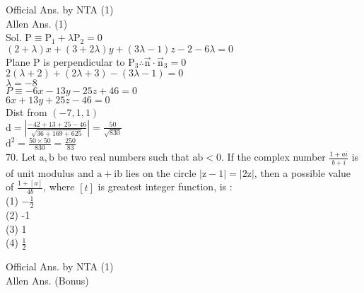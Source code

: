 \documentclass[10pt]{article}
\begin{document}
Official Ans. by NTA (1)\\
Allen Ans. (1)\\
Sol. \(\mathrm{P} \equiv \mathrm{P}_{1}+\lambda \mathrm{P}_{2}=0\)\\
\((2+\lambda) x+(3+2 \lambda) y+(3 \lambda-1) z-2-6 \lambda=0\)\\
Plane P is perpendicular to \(\mathrm{P}_{3} \therefore \overrightarrow{\mathrm{n}} \cdot \overrightarrow{\mathrm{n}}_{3}=0\)\\
\(2(\lambda+2)+(2 \lambda+3)-(3 \lambda-1)=0\)\\
\(\lambda=-8\)\\
\(P \equiv-6 x-13 y-25 z+46=0\)\\
\(6 x+13 y+25 z-46=0\)\\
Dist from \((-7,1,1)\)\\
\(\mathrm{d}=\left|\frac{-42+13+25-46}{\sqrt{36+169+625}}\right|=\frac{50}{\sqrt{830}}\)\\
\(\mathrm{d}^{2}=\frac{50 \times 50}{830}=\frac{250}{83}\)\\
70. Let \(\mathrm{a}, \mathrm{b}\) be two real numbers such that \(\mathrm{ab}<0\). If the complex number \(\frac{1+a i}{b+i}\) is of unit modulus and \(\mathrm{a}+\mathrm{ib}\) lies on the circle \(|\mathrm{z}-1|=|2 \mathrm{z}|\), then a possible value of \(\frac{1+[a]}{4 b}\), where \([t]\) is greatest integer function, is :\\
(1) \(-\frac{1}{2}\)\\
(2) -1\\
(3) 1\\
(4) \(\frac{1}{2}\)

Official Ans. by NTA (1)\\
Allen Ans. (Bonus)
\end{document}
